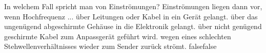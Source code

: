     {In welchem Fall spricht man von Einströmungen? Einströmungen liegen dann vor, wenn Hochfrequenz ...}
    {über Leitungen oder Kabel in ein Gerät gelangt.}
    {über das ungenügend abgeschirmte Gehäuse in die Elektronik gelangt.}
    {über nicht genügend geschirmte Kabel zum Anpassgerät geführt wird.}
    {wegen eines schlechten Stehwellenverhältnisses wieder zum Sender zurück strömt.}
    {false}{false}